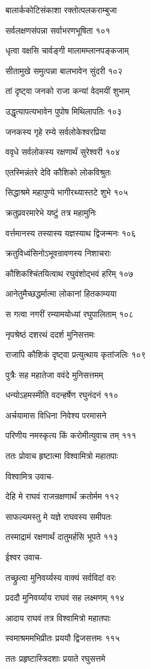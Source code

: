 बालार्ककोटिसंकाशा रक्तोत्पलकराम्बुजा

सर्वलक्षणसंपन्ना सर्वाभरणभूषिता १०१

धृत्वा वक्षसि चार्वङ्गी मालामम्लानपङ्कजाम्

सीतामुखे समुत्पन्ना बालभावेन सुंदरी १०२

तां दृष्ट्वा जनको राजा कन्यां वेदमयीं शुभाम्

उद्धृत्यापत्यभावेन पुपोष मिथिलापतिः १०३

जनकस्य गृहे रम्ये सर्वलोकेश्वरप्रिया

ववृधे सर्वलोकस्य रक्षणार्थं सुरेश्वरी १०४

एतस्मिन्नंतरे देवि कौशिको लोकविश्रुतः

सिद्धाश्रमे महापुण्ये भागीरथ्यास्तटे शुभे १०५

क्रतुप्रवरमारेभे यष्टुं तत्र महामुनिः

वर्त्तमानस्य तस्यास्य यज्ञस्याथ द्विजन्मनः १०६

क्रतुविध्वंसिनोऽभूवन्रावणस्य निशाचराः

कौशिकश्चिंतयित्वाथ रघुवंशोद्भवं हरिम् १०७

आनेतुमैच्छद्धर्मात्मा लोकानां हितकाम्यया

स गत्वा नगरीं रम्यामयोध्यां रघुपालिताम् १०८

नृपश्रेष्ठं दशरथं ददर्श मुनिसत्तमः

राजापि कौशिकं दृष्ट्वा प्रत्युत्थाय कृतांजलिः १०९

पुत्रैः सह महातेजा ववंदे मुनिसत्तमम्

धन्योऽहमस्मीति वदन्हर्षेण रघुनंदनं ११०

अर्चयामास विधिना निवेश्य परमासने

परिणीय नमस्कृत्य किं करोमीत्युवाच तम् १११

ततः प्रोवाच हृष्टात्मा विश्वामित्रो महातपाः

विश्वामित्र उवाच-

देहि मे राघवं राजन्रक्षणार्थं क्रतोर्मम ११२

साफल्यमस्तु मे यज्ञे राघवस्य समीपतः

तस्माद्रामं रक्षणार्थं दातुमर्हसि भूपते ११३

ईश्वर उवाच-

तच्छ्रुत्वा मुनिवर्य्यस्य वाक्यं सर्वविदां वरः

प्रददौ मुनिवर्य्याय राघवं सह लक्ष्मणम् ११४

आदाय राघवं तत्र विश्वामित्रो महातपाः

स्वमाश्रममभिप्रीतः प्रययौ द्विजसत्तमः ११५

ततः प्रहृष्टास्त्रिदशाः प्रयाते रघुसत्तमे

